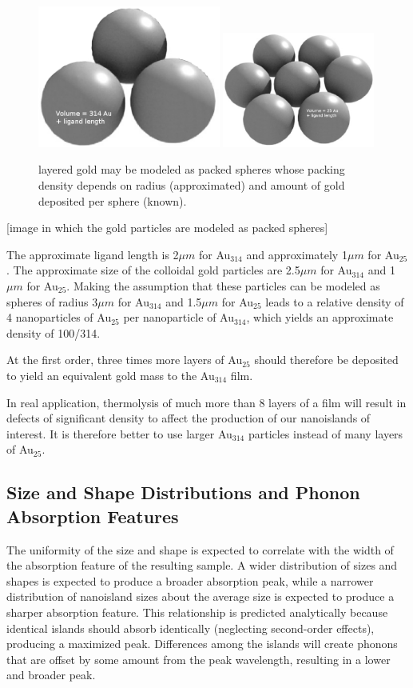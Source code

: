\documentclass[12pt,oneside,english]{article}
\begin{document}
	\begin{figure}
		\includegraphics[width=60mm]{images/willitblend-big.eps}
		\includegraphics[width=50mm]{images/willitblend.eps}
		\caption{layered gold may be modeled as packed spheres whose packing density depends on radius (approximated) and amount of gold deposited per sphere (known).}
	\end{figure}
	[image in which the gold particles are modeled as packed spheres]	
	
	The approximate ligand length is 2${\mu}m$ for Au$_{314}$ and approximately 1${\mu}m$ for Au$_{25}$.
	The approximate size of the colloidal gold particles are 2.5${\mu}m$ for Au$_{314}$ and 1${\mu}m$ for Au$_{25}$.
	Making the assumption that these particles can be modeled as spheres of radius 3${\mu}m$ for Au$_{314}$ and 1.5${\mu}m$ for Au$_{25}$ leads to a relative density of 4 nanoparticles of Au$_{25}$ per nanoparticle of Au$_{314}$, which yields an approximate density of 100/314.
	
	At the first order, three times more layers of Au$_{25}$ should therefore be deposited to yield an equivalent gold mass to the Au$_{314}$ film.
	
	In real application, thermolysis of much more than 8 layers of a film will result in defects of significant density to affect the production of our nanoislands of interest.
	It is therefore better to use larger Au$_{314}$ particles instead of many layers of Au$_{25}$.


	\subsection{Size and Shape Distributions and Phonon Absorption Features}
	The uniformity of the size and shape is expected to correlate with the width of the absorption feature of the resulting sample.
	A wider distribution of sizes and shapes is expected to produce a broader absorption peak, while a narrower distribution of nanoisland sizes about the average size is expected to produce a sharper absorption feature.
	This relationship is predicted analytically because identical islands should absorb identically (neglecting second-order effects), producing a maximized peak.  
	Differences among the islands will create phonons that are offset by some amount from the peak wavelength, resulting in a lower and broader peak.
\end{document}
